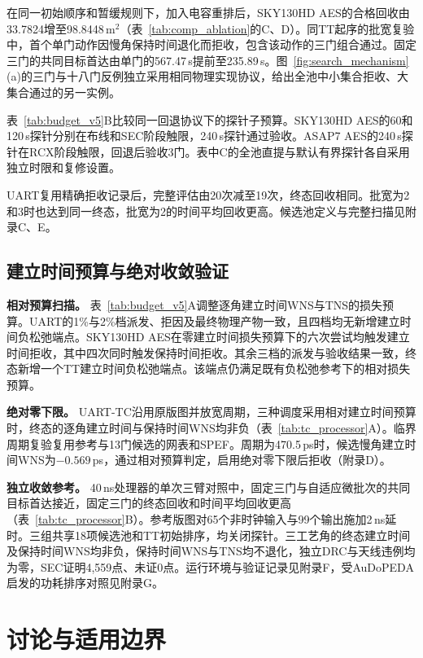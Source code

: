 \documentclass[twocolumn,10pt,fontset=windows]{ctexart}
\begin{document}
在同一初始顺序和暂缓规则下，加入电容重排后，SKY130HD AES的合格回收由33.7824增至98.8448\,\textmu m$^2$（表~\ref{tab:comp_ablation}的C、D）。同TT起序的批宽复验中，首个单门动作因慢角保持时间退化而拒收，包含该动作的三门组合通过。固定三门的共同目标首达由单门的567.47\,s提前至235.89\,s。图~\ref{fig:search_mechanism}(a)的三门与十八门反例独立采用相同物理实现协议，给出全池中小集合拒收、大集合通过的另一实例。

表~\ref{tab:budget_v5}B比较同一回退协议下的探针子预算。SKY130HD AES的60和120\,s探针分别在布线和SEC阶段触限，240\,s探针通过验收。ASAP7 AES的240\,s探针在RCX阶段触限，回退后验收3门。表中C的全池直提与默认有界探针各自采用独立时限和复修设置。

UART复用精确拒收记录后，完整评估由20次减至19次，终态回收相同。批宽为2和3时也达到同一终态，批宽为2的时间平均回收更高。候选池定义与完整扫描见附录C、E。

\subsection{建立时间预算与绝对收敛验证}
\label{sec:budget_sweeps}

\textbf{相对预算扫描。} 表~\ref{tab:budget_v5}A调整逐角建立时间WNS与TNS的损失预算。UART的1\%与2\%档派发、拒因及最终物理产物一致，且四档均无新增建立时间负松弛端点。SKY130HD AES在零建立时间损失预算下的六次尝试均触发建立时间拒收，其中四次同时触发保持时间拒收。其余三档的派发与验收结果一致，终态新增一个TT建立时间负松弛端点。该端点仍满足既有负松弛参考下的相对损失预算。

\textbf{绝对零下限。} UART-TC沿用原版图并放宽周期，三种调度采用相对建立时间预算时，终态的逐角建立时间与保持时间WNS均非负（表~\ref{tab:tc_processor}A）。临界周期复验复用参考与13门候选的网表和SPEF。周期为470.5\,ps时，候选慢角建立时间WNS为$-0.569$\,ps，通过相对预算判定，启用绝对零下限后拒收（附录D）。

\textbf{独立收敛参考。} 40\,ns处理器的单次三臂对照中，固定三门与自适应微批次的共同目标首达接近，固定三门的终态回收和时间平均回收更高（表~\ref{tab:tc_processor}B）。参考版图对65个非时钟输入与99个输出施加2\,ns延时。三组共享18项候选池和TT初始排序，均关闭探针。三工艺角的终态建立时间及保持时间WNS均非负，保持时间WNS与TNS均不退化，独立DRC与天线违例均为零，SEC证明4,559点、未证0点。运行环境与验证记录见附录F，受\mbox{AuDoPEDA}\cite{ghose2026audopeda}启发的功耗排序对照见附录G。

\FloatBarrier
\section{讨论与适用边界}
\end{document}
